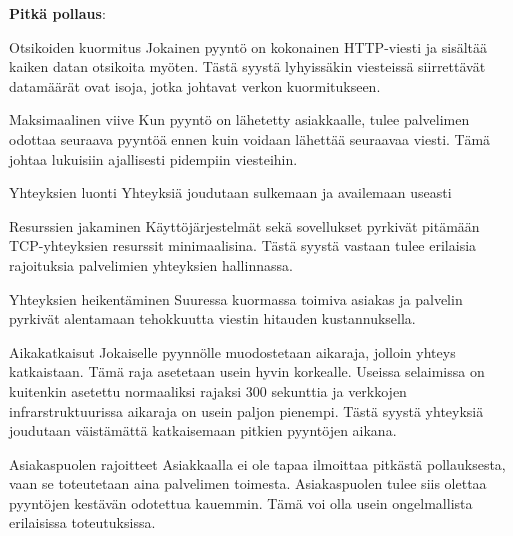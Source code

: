 \documentclass[utf8]{gradu3}
\begin{document}
\textbf{Pitkä pollaus}:
\begin{desclist}
\item[Otsikoiden kuormitus] Jokainen pyyntö on kokonainen HTTP-viesti ja sisältää kaiken datan otsikoita myöten. Tästä syystä lyhyissäkin viesteissä siirrettävät datamäärät ovat isoja, jotka johtavat verkon kuormitukseen.
\item[Maksimaalinen viive] Kun pyyntö on lähetetty asiakkaalle, tulee palvelimen odottaa seuraava pyyntöä ennen kuin voidaan lähettää seuraavaa viesti. Tämä johtaa lukuisiin ajallisesti pidempiin viesteihin.
\item[Yhteyksien luonti] Yhteyksiä joudutaan sulkemaan ja availemaan useasti
\item[Resurssien jakaminen] Käyttöjärjestelmät sekä sovellukset pyrkivät pitämään TCP-yhteyksien resurssit minimaalisina. Tästä syystä vastaan tulee erilaisia rajoituksia palvelimien yhteyksien hallinnassa.
\item[Yhteyksien heikentäminen] Suuressa kuormassa toimiva asiakas ja palvelin pyrkivät alentamaan tehokkuutta viestin hitauden kustannuksella.
\item[Aikakatkaisut] Jokaiselle pyynnölle muodostetaan aikaraja, jolloin yhteys katkaistaan. Tämä raja asetetaan usein hyvin korkealle. Useissa selaimissa on kuitenkin asetettu normaaliksi rajaksi 300 sekunttia ja verkkojen infrarstruktuurissa aikaraja on usein paljon pienempi. Tästä syystä yhteyksiä joudutaan väistämättä katkaisemaan pitkien pyyntöjen aikana.
\item[Asiakaspuolen rajoitteet] Asiakkaalla ei ole tapaa ilmoittaa pitkästä pollauksesta, vaan se toteutetaan aina palvelimen toimesta. Asiakaspuolen tulee siis olettaa pyyntöjen kestävän odotettua kauemmin. Tämä voi olla usein ongelmallista erilaisissa toteutuksissa.
\end{desclist}
\end{document}
